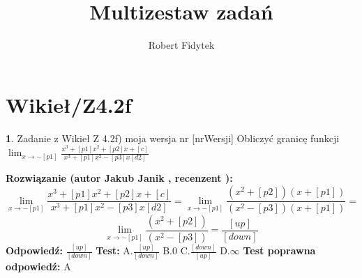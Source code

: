 \documentclass[12pt, a4paper]{article}
\title{Multizestaw zadań}
\author{Robert Fidytek}
\date{}
\theoremstyle{definition} %
\newtheorem{zad}{}
\newcommand{\kategoria}[1]{\section{#1}} %
\newcommand{\zadStart}[1]{\begin{zad}#1\newline} %
\newcommand{\zadStop}{\end{zad}}   %
\newcommand{\rozwStart}[2]{\noindent \textbf{Rozwiązanie (autor #1 , recenzent #2): }\newline} %
\newcommand{\rozwStop}{\newline}                                            %
\newcommand{\odpStart}{\noindent \textbf{Odpowiedź:}\newline}    %
\newcommand{\odpStop}{\newline}                                             %
\newcommand{\testStart}{\noindent \textbf{Test:}\newline} %
\newcommand{\testStop}{\newline} %
\newcommand{\kluczStart}{\noindent \textbf{Test poprawna odpowiedź:}\newline} %
\newcommand{\kluczStop}{\newline} %
\begin{document}
\maketitle


\kategoria{Wikieł/Z4.2f}
\zadStart{Zadanie z Wikieł Z 4.2f) moja wersja nr [nrWersji]}
Obliczyć granicę funkcji $\lim_{x \to -[p1]} \frac{x^3 + [p1]x^2 + [p2]x + [c]}{x^3 + [p1]x^2 - [p3]x [d2]}$
\zadStop
\rozwStart{Jakub Janik}{}
$$\lim_{x \to -[p1]} \frac{x^3 + [p1]x^2 + [p2]x + [c]}{x^3 + [p1]x^2 - [p3]x [d2]}=\lim_{x \to -[p1]} \frac{(x^2+[p2])(x+[p1])}{(x^2-[p3])(x+[p1])}=$$
$$\lim_{x \to -[p1]} \frac{(x^2+[p2])}{(x^2-[p3])}=\frac{[up]}{[down]}$$
\rozwStop
\odpStart
$\frac{[up]}{[down]}$
\odpStop
\testStart
A.$\frac{[up]}{[down]}$
B.$0$
C.$\frac{[down]}{[up]}$
D.$\infty$
\testStop
\kluczStart
A
\kluczStop
\end{document}
